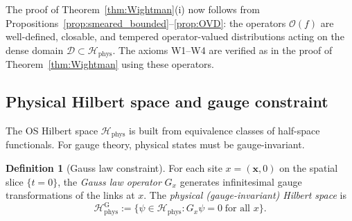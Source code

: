 \documentclass[11pt,a4paper]{amsart}
\theoremstyle{definition}
\newtheorem{definition}[theorem]{Definition}
\begin{document}
The proof of Theorem~\ref{thm:Wightman}(i) now follows from
Propositions~\ref{prop:smeared_bounded}--\ref{prop:OVD}: the operators
$\mathcal{O}(f)$ are well-defined, closable, and tempered operator-valued
distributions acting on the dense domain $\mathcal{D}\subset\mathcal{H}_{\mathrm{phys}}$.
The axioms W1--W4 are verified as in the proof of Theorem~\ref{thm:Wightman}
using these operators.

\subsection{Physical Hilbert space and gauge constraint}
\label{sec:gauge_Hilbert}

The OS Hilbert space $\mathcal{H}_{\mathrm{phys}}$ is built from equivalence
classes of half-space functionals.  For gauge theory, physical states must
be gauge-invariant.

\begin{definition}[Gauss law constraint]
\label{def:Gauss_law}
For each site $x = (\mathbf{x}, 0)$ on the spatial slice $\{t=0\}$, the
\emph{Gauss law operator} $G_x$ generates infinitesimal gauge transformations
of the links at $x$.  The \emph{physical (gauge-invariant) Hilbert space} is
\begin{equation}
\label{eq:H_phys_gauge}
  \mathcal{H}_{\mathrm{phys}}^{\mathrm{G}}
  := \bigl\{\psi \in \mathcal{H}_{\mathrm{phys}} : G_x\psi = 0
     \;\text{for all }x\bigr\}.
\end{equation}
\end{definition}
\end{document}
